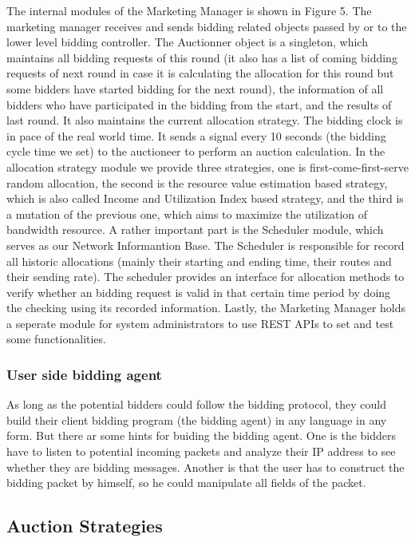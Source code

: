 \documentclass[a4paper,11pt,twocolumn]{article}
\begin{document}
The internal modules of the Marketing Manager is shown in Figure 5. The marketing manager receives and sends bidding related objects passed by 
or to the lower level bidding controller. The Auctionner object is a singleton, which maintains all bidding requests of this round (it also
has a list of coming bidding requests of next round in case it is calculating the allocation for this round but some bidders have started
bidding for the next round), the information of all bidders who have participated in the bidding from the start, and the results of last round.
It also maintains the current allocation strategy. The bidding clock is in pace of the real world time. It sends a signal every 10 seconds (the 
bidding cycle time we set) to the auctioneer to perform an auction calculation. In the allocation strategy module we provide three strategies,
one is first-come-first-serve random allocation, the second is the resource value estimation based strategy, which is also called Income and Utilization 
Index based strategy, and the third is a mutation of the previous one, which aims to maximize the utilization of bandwidth resource. A rather
important part is the Scheduler module, which serves as our Network Informantion Base. The Scheduler is responsible for record all historic 
allocations (mainly their starting and ending time, their routes and their sending rate). The scheduler provides an interface for allocation methods
to verify whether an bidding request is valid in that certain time period by doing the checking using its recorded information. Lastly, the Marketing
Manager holds a seperate module for system administrators to use REST APIs to set and test some functionalities.

\subsubsection{User side bidding agent}
As long as the potential bidders could follow the bidding protocol, they could build their client bidding program (the bidding agent) in any language
in any form. But there ar some hints for buiding the bidding agent. One is the bidders have to listen to potential incoming packets and analyze 
their IP address to see whether they are bidding messages. Another is that the user has to construct the bidding packet by himself, so he could 
manipulate all fields of the packet. 

\subsection{Auction Strategies}
\end{document}
